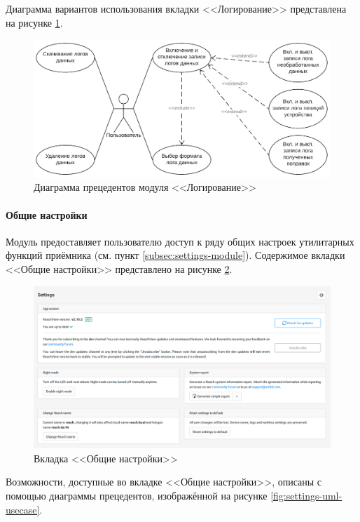Диаграмма вариантов использования вкладки <<Логирование>> представлена на рисунке \ref{fig:logging-uml-usecase}.

\begin{figure}[h!]
  \centering
  \setlength{\fboxsep}{5pt}
  \includegraphics[width=.75\textwidth]{img/uml/logging_usecase}
  \vspace*{6pt}
  \caption{Диаграмма прецедентов модуля <<Логирование>>}
  \label{fig:logging-uml-usecase}
\end{figure}

\paragraph{Общие настройки}

Модуль предоставляет пользователю доступ к ряду общих настроек  утилитарных функций приёмника (см. пункт \ref{subsec:settings-module}). Содержимое вкладки <<Общие настройки>> представлено на рисунке \ref{fig:settings}.

\begin{figure}[h!]
  \centering
  \setlength{\fboxsep}{5pt}
  \includegraphics[width=.8\textwidth]{img/reachview/settings_content_laptop}
  \vspace*{6pt}
  \caption{Вкладка <<Общие настройки>>}
  \label{fig:settings}
\end{figure}

Возможности, доступные во вкладке <<Общие настройки>>, описаны с помощью диаграммы прецедентов, изображённой на рисунке \ref{fig:settings-uml-usecase}.

